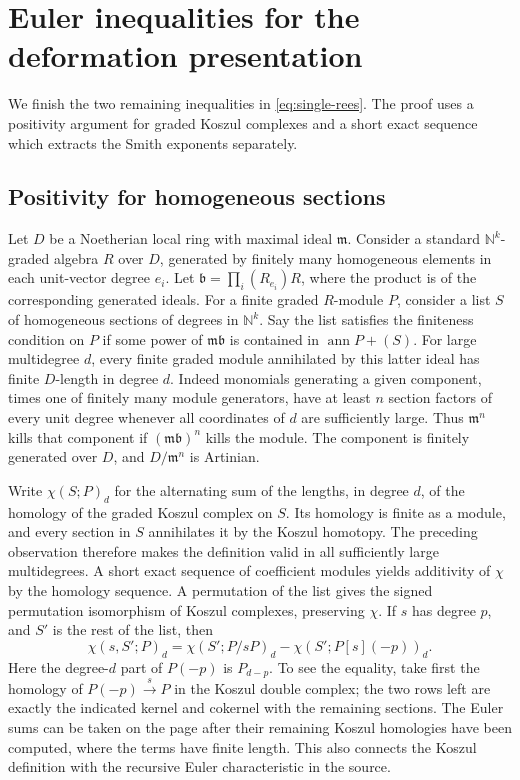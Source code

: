 \section{Euler inequalities for the deformation presentation}
\label{sec:deformation-euler}

We finish the two remaining inequalities in \eqref{eq:single-rees}.
The proof uses a positivity argument for graded Koszul complexes and a
short exact sequence which extracts the Smith exponents separately.

\subsection{Positivity for homogeneous sections}

Let \(D\) be a Noetherian local ring with maximal ideal \(\mathfrak m\).
Consider a standard \(\mathbb N^k\)-graded algebra \(R\) over \(D\),
generated by finitely many homogeneous elements in each unit-vector
degree \(e_i\). Let \(\mathfrak b=\prod_i(R_{e_i})R\), where the
product is of the corresponding generated ideals. For a finite graded
\(R\)-module \(P\), consider a list \(S\) of homogeneous sections
of degrees in \(\mathbb N^k\). Say the list satisfies the finiteness
condition on \(P\) if some power of \(\mathfrak m\mathfrak b\) is
contained in \(\operatorname{ann}P+(S)\).
For large multidegree \(d\), every finite graded module annihilated
by this latter ideal has finite \(D\)-length in degree \(d\).
Indeed monomials generating a given component, times one of finitely
many module generators, have at least \(n\) section factors of every
unit degree whenever all coordinates of \(d\) are sufficiently large.
Thus \(\mathfrak m^n\) kills that component if
\((\mathfrak m\mathfrak b)^n\) kills the module. The component is
finitely generated over \(D\), and \(D/\mathfrak m^n\) is Artinian.

Write \(\chi(S;P)_d\) for the alternating sum of the lengths, in degree
\(d\), of the homology of the graded Koszul complex on \(S\). Its
homology is finite as a module, and every section in \(S\) annihilates
it by the Koszul homotopy. The preceding observation therefore makes
the definition valid in all sufficiently large multidegrees. A short
exact sequence of coefficient modules yields additivity of \(\chi\)
by the homology sequence. A permutation of the list gives the signed
permutation isomorphism of Koszul complexes, preserving \(\chi\).
If \(s\) has degree \(p\), and \(S'\) is the rest of the list, then
\[
 \chi(s,S';P)_d=\chi(S';P/sP)_d
                     -\chi(S';P[s](-p))_d .
\]
Here the degree-\(d\) part of \(P(-p)\) is \(P_{d-p}\).
To see the equality, take first the homology of
\(P(-p)\xrightarrow{s}P\) in the Koszul double complex; the two rows
left are exactly the indicated kernel and cokernel with the
remaining sections. The Euler sums can be taken on the page after
their remaining Koszul homologies have been computed, where the
terms have finite length. This also connects the Koszul definition
with the recursive Euler characteristic in the source.

